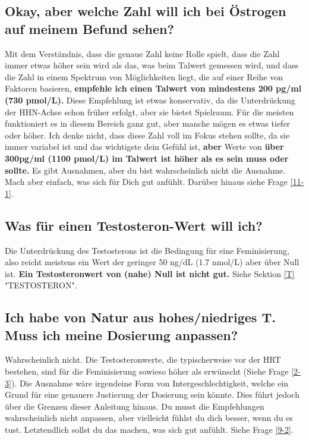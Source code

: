 \documentclass{article}
\begin{document}
\subsection{Okay, aber welche Zahl will ich bei Östrogen auf meinem Befund sehen?}

Mit dem Verständnis, dass die genaue Zahl keine Rolle spielt, dass die Zahl immer etwas höher sein wird als das, was beim Talwert gemessen wird, und dass die Zahl in einem Spektrum von Möglichkeiten liegt, die auf einer Reihe von Faktoren basieren, \textbf{empfehle ich einen Talwert von mindestens 200 pg/ml (730 pmol/L).} Diese Empfehlung ist etwas konservativ, da die Unterdrückung der HHN-Achse schon früher erfolgt, aber sie bietet Spielraum. Für die meisten funktioniert es in diesem Bereich ganz gut, aber manche mögen es etwas tiefer oder höher. Ich denke nicht, dass diese Zahl voll im Fokus stehen sollte, da sie immer variabel ist und das wichtigste dein Gefühl ist, \textbf{aber} Werte von \textbf{über 300pg/ml (1100 pmol/L) im Talwert ist höher als es sein muss oder sollte.} Es gibt Ausnahmen, aber du bist wahrscheinlich nicht die Ausnahme. Mach aber einfach, was sich für Dich gut anfühlt. Darüber hinaus siehe Frage \ref{11-1}.

\subsection{Was für einen Testosteron-Wert will ich?}

Die Unterdrückung des Testosterons ist die Bedingung für eine Feminisierung, also reicht meistens ein Wert der geringer 50 ng/dL (1.7 nmol/L) aber über Null ist. \textbf{Ein Testosteronwert von (nahe) Null ist nicht gut.} Siehe Sektion \ref{T} "TESTOSTERON".

\subsection{Ich habe von Natur aus hohes/niedriges T. Muss ich meine Dosierung anpassen?}

Wahrscheinlich nicht. Die Testosteronwerte, die typischerweise vor der HRT bestehen, sind für die Feminisierung sowieso höher als erwünscht (Siehe Frage \ref{2-3}). Die Ausnahme wäre irgendeine Form von Intergeschlechtigkeit, welche ein Grund für eine genauere Justierung der Dosierung sein könnte. Dies führt jedoch über die Grenzen dieser Anleitung hinaus. Du musst die Empfehlungen wahrscheinlich nicht anpassen, aber vielleicht fühlst du dich besser, wenn du es tust. Letztendlich sollst du das machen, was sich gut anfühlt. Siehe Frage \ref{9-2}.
\end{document}
